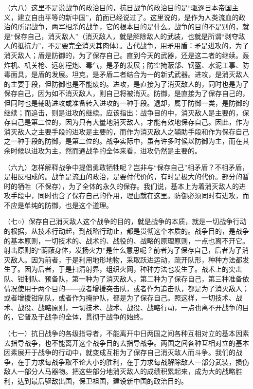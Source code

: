 \documentclass[UTF8, 12pt, a4paper]{ctexrep}
\begin{document}
（六八）这里不是说战争的政治目的，抗日战争的政治目的是“驱逐日本帝国主义，建立自由平等的新中国”，前面已经说过了。这里说的，是作为人类流血的政治的所谓战争，两军相杀的战争，它的根本目的是什么。战争的目的不是别的，就是“保存自己，消灭敌人”（消灭敌人，就是解除敌人的武装，也就是所谓“剥夺敌人的抵抗力”，不是要完全消灭其肉体）。古代战争，用矛用盾：矛是进攻的，为了消灭敌人；盾是防御的，为了保存自己。直到今天的武器，还是这二者的继续。轰炸机、机关枪、远射程炮、毒气，是矛的发展；防空掩蔽部、钢盔、水泥工事、防毒面具，是盾的发展。坦克，是矛盾二者结合为一的新式武器。进攻，是消灭敌人的主要手段，但防御也是不能废的。进攻，是直接为了消灭敌人的，同时也是为了保存自己，因为如不消灭敌人，则自己将被消灭。防御，是直接为了保存自己的，但同时也是辅助进攻或准备转入进攻的一种手段。退却，属于防御一类，是防御的继续；而追击，则是进攻的继续。应该指出：战争目的中，消灭敌人是主要的，保存自己是第二位的，因为只有大量地消灭敌人，才能有效地保存自己。因此，作为消灭敌人之主要手段的进攻是主要的，而作为消灭敌人之辅助手段和作为保存自己之一种手段的防御，是第二位的。战争实际中，虽有许多时候以防御为主，而在其余时候以进攻为主，然而通战争的全体来看，进攻仍然是主要的。

（六九）怎样解释战争中提倡勇敢牺牲呢？岂非与“保存自己”相矛盾？不相矛盾，是相反相成的。战争是流血的政治，是要付代价的，有时是极大的代价。部分的暂时的牺牲（不保存），为了全体的永久的保存。我们说，基本上为着消灭敌人的进攻手段中，同时也含了保存自己的作用，理由就在这里。防御必须同时有进攻，而不应是单纯的防御，也是这个道理。

（七○）保存自己消灭敌人这个战争的目的，就是战争的本质，就是一切战争行动的根据，从技术行动起，到战略行动止，都是贯彻这个本质的。战争目的，是战争的基本原则，一切技术的、战术的、战役的、战略的原理原则，一点也离不开它。射击原则的“荫蔽身体，发扬火力”是什么意思呢？前者为了保存自己，后者为了消灭敌人。因为前者，于是利用地形地物，采取跃进运动，疏开队形，种种方法都发生了。因为后者，于是扫清射界，组织火网，种种方法也发生了。战术上的突击队、钳制队、预备队，第一种为了消灭敌人，第二种为了保存自己，第三种准备依情况使用于两个目的——或者增援突击队，或者作为追击队，都是为了消灭敌人；或者增援钳制队，或者作为掩护队，都是为了保存自己。照这样，一切技术、战术、战役、战略原则，一切技术、战术、战役、战略行动，一点也离不开战争的目的，它普及于战争的全体，贯彻于战争的始终。

（七一）抗日战争的各级指导者，不能离开中日两国之间各种互相对立的基本因素去指导战争，也不能离开这个战争目的去指导战争。两国之间各种互相对立的基本因素展开于战争的行动中，就变成互相为了保存自己消灭敌人而斗争。我们的战争，在于力求每战争取不论大小的胜利，在于力求每战解除敌人一部分武装，损伤敌人一部分人马器物。把这些部分地消灭敌人的成绩积累起来，成为大的战略胜利，达到最后驱敌出国，保卫祖国，建设新中国的政治目的。
\end{document}
